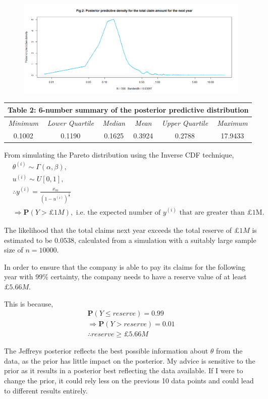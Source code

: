 \documentclass[11pt,a4paper]{article}
\renewcommand{\P}{\textbf{P}}
\renewcommand{\a}{\alpha}
\renewcommand{\b}{\beta}
\renewcommand{\th}{\theta}
\begin{document}
\begin{figure}[!ht]
\includegraphics[width=\textwidth]{Q3_Graph_03.png}
\end{figure}
\begin{center}{
    \setlength\extrarowheight{3pt}
    \noindent\begin{tabular}{|c c c c c c|}
        \hline
        \multicolumn{6}{|c|}{ \textbf{Table 2: 6-number summary of the posterior predictive distribution} }\\
        \hline
        \textit{Minimum} & \textit{Lower Quartile} & \textit{Median} & \textit{Mean} & \textit{Upper Quartile} & \textit{Maximum} \\
        \hline
        0.1002 & 0.1190 & 0.1625 & 0.3924 & 0.2788 & 17.9433 \\
        \hline
    \end{tabular}
}
\end{center}

From simulating the Pareto distribution using the Inverse CDF technique,
\begin{align*}
    &\theta^{(i)} \sim \Gamma(\a,\b),\\
    &u^{(i)} \sim U[0,1], \\
    &\therefore y^{(i)} = \frac{x_m}{(1-u^{(i)})^{\frac{1}{\th}} } \\
    &\Rightarrow \P(Y > £1M), \text{ i.e. the expected number of }y^{(i)} \text{ that are greater than £1M}.
\end{align*}

The likelihood that the total claims next year exceeds the total reserve of $£1M$ is estimated to be $0.0538$, calculated from a simulation with a  suitably large sample size of $n=10000$. 


In order to ensure that the company is able to pay its claims for the following year with 99\% certainty, the company needs to have a reserve value of at least $£5.66M$. 

This is because, 
\begin{align*}
    \P(Y \leq reserve) = 0.99 \\
    \Rightarrow \P(Y > reserve ) = 0.01 \\
    \therefore reserve \geq £5.66M
\end{align*}

The Jeffreys posterior reflects the best possible information about $\th$ from the data, as the prior has little impact on the posterior. My advice is sensitive to the prior as it results in a posterior best reflecting the data available. If I were to change the prior, it could rely less on the previous 10 data points and could lead to different results entirely. 


\end{document}
